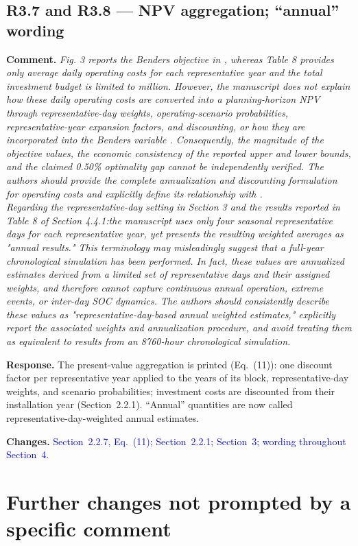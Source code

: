 \documentclass[11pt]{article}
\newcommand{\rcomment}[1]{\par\medskip\noindent\textbf{Comment.} \textit{#1}\par\smallskip}
\newcommand{\rresponse}[1]{\noindent\textbf{Response.} #1\par\smallskip}
\newcommand{\rchanges}[1]{\noindent\textbf{Changes.} \textcolor{blue}{#1}\par\medskip}
\begin{document}
\subsection*{R3.7 and R3.8 --- NPV aggregation; ``annual'' wording}
\rcomment{
Fig. 3 reports the Benders objective in , whereas Table 8 provides only average daily operating costs for each representative year and the total investment budget is limited to million. However, the manuscript does not explain how these daily operating costs are converted into a planning-horizon NPV through representative-day weights, operating-scenario probabilities, representative-year expansion factors, and discounting, or how they are incorporated into the Benders variable . Consequently, the magnitude of the objective values, the economic consistency of the reported upper and lower bounds, and the claimed 0.50\% optimality gap cannot be independently verified. The authors should provide the complete annualization and discounting formulation for operating costs and explicitly define its relationship with .\\
Regarding the representative-day setting in Section 3 and the results reported in Table 8 of Section 4.4.1:the manuscript uses only four seasonal representative days for each representative year, yet presents the resulting weighted averages as "annual results." This terminology may misleadingly suggest that a full-year chronological simulation has been performed. In fact, these values are annualized estimates derived from a limited set of representative days and their assigned weights, and therefore cannot capture continuous annual operation, extreme events, or inter-day SOC dynamics. The authors should consistently describe these values as "representative-day-based annual weighted estimates," explicitly report the associated weights and annualization procedure, and avoid treating them as equivalent to results from an 8760-hour chronological simulation.
}
\rresponse{The present-value aggregation is printed (Eq.~(11)): one discount factor per representative year applied to
the years of its block, representative-day weights, and scenario probabilities; investment costs are
discounted from their installation year (Section~2.2.1). ``Annual'' quantities are now called representative-day-weighted annual
estimates.}
\rchanges{Section~2.2.7, Eq.~(11); Section~2.2.1; Section~3; wording throughout Section~4.}

\section*{Further changes not prompted by a specific comment}
\end{document}
